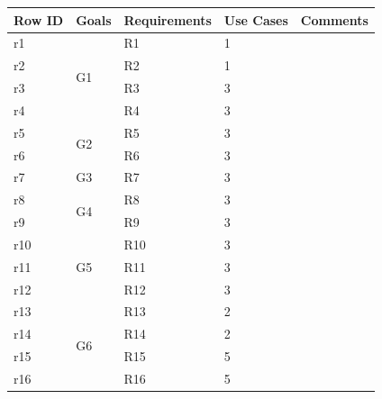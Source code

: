 	\begin{table}[h!]
	\centering
	\begin{tabular}{|l|l|l|l|l|}
	\hline
	\textbf{Row ID}		&	\textbf{Goals}		& \textbf{Requirements}	& \textbf{Use Cases}			&\textbf{Comments}\\ \hline
 			r1						&\multirow{4}{*}{G1}			&   	R1 								&  1										&\\\cline{3-5}\cline{0-0}
 			r2						&											& 		R2								&	 1										&\\\cline{3-5}\cline{0-0}
 			r3						&											&   	R3 								&  3										&\\\cline{3-5}\cline{0-0}
 			r4						&											&   	R4 								&  3										&\\\cline{3-5}\cline{0-0} \hline
 											
 			r5						&\multirow{2}{*}{G2}			&   	R5 								&  3										&\\\cline{3-5}\cline{0-0}
 			r6						&											&   	R6 								&  3										&\\\cline{3-5} \cline{0-0}\hline
 											
 			r7						&\multirow{1}{*}{G3}			&	   	R7 								&  3										&\\\cline{3-5}\cline{0-0}\hline
 	
 			r8						&\multirow{2}{*}{G4}			&   	R8 								&  3										&\\\cline{3-5}\cline{0-0}
 			r9						&											&   	R9 								&  3										&\\\cline{3-5}\cline{0-0} \hline
 											
 			r10					&\multirow{3}{*}{G5}			&   	R10 								&  3										&\\\cline{3-5}\cline{0-0}
 			r11					&											&   	R11 								&  3										&\\\cline{3-5}\cline{0-0}
 			r12					&											&   	R12 								&  3										&\\\cline{3-5}\cline{0-0}\hline
 											
 			r13					&\multirow{4}{*}{G6}			&   	R13 								&  2										&\\\cline{3-5}\cline{0-0}
 			r14					&											&   	R14 								&  2										&\\\cline{3-5}\cline{0-0}
 			r15					&											&   	R15 								&  5										&\\\cline{3-5}\cline{0-0}
 			r16					&											&   	R16 								&  5										&\\\cline{3-5}\cline{0-0}\hline
 											

\end{tabular}
\end{table}
